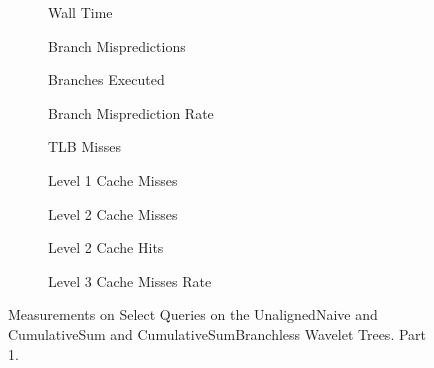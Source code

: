 \clearpage




\begin{figure}\tiny

\begin{subfigure}{0.30\textwidth}
	
	\caption{Wall Time}
	\label{fig:CumulativeSumSelectWalltime}
\end{subfigure}
\hfill
\begin{subfigure}{0.30\textwidth}
	
	\caption{Branch Mispredictions}
	\label{fig:CumulativeSumSelectBranchMiss}
\end{subfigure}
\hfill
\begin{subfigure}{0.30\textwidth}
	
	\caption{Branches Executed}
	\label{fig:CumulativeSumSelectBranchExe}
\end{subfigure}


\begin{subfigure}{0.30\textwidth}
	
	\caption{Branch Misprediction Rate}
	\label{fig:CumulativeSumSelectBranchMissRate}
\end{subfigure}
\hfill
\begin{subfigure}{0.30\textwidth}
	
	\caption{TLB Misses}
	\label{fig:CumulativeSumSelectTLBMiss}
\end{subfigure}
\hfill
\begin{subfigure}{0.30\textwidth}
	
	\caption{Level 1 Cache Misses}
	\label{fig:CumulativeSumSelectL1CM}
\end{subfigure}


\begin{subfigure}{0.30\textwidth}
	
	\caption{Level 2 Cache Misses}
	\label{fig:CumulativeSumSelectL2CM}
\end{subfigure}
\hfill
\begin{subfigure}{0.30\textwidth}
	
	\caption{Level 2 Cache Hits}
	\label{fig:CumulativeSumSelectL2CHits}
\end{subfigure}
\hfill
%	
\begin{subfigure}{0.30\textwidth}
	
	\caption{Level 3 Cache Misses Rate}
	\label{fig:CumulativeSumSelectL3CM}
\end{subfigure}

\caption{Measurements on Select Queries on the UnalignedNaive and CumulativeSum and CumulativeSumBranchless Wavelet Trees. Part 1.}
\label{fig:CumulativeSumSelect}
\end{figure}





\restoregeometry













